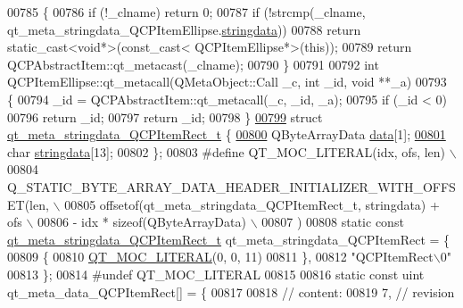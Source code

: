 \begin{DoxyCode}
00785 \{
00786     \textcolor{keywordflow}{if} (!\_clname) \textcolor{keywordflow}{return} 0;
00787     \textcolor{keywordflow}{if} (!strcmp(\_clname, qt\_meta\_stringdata\_QCPItemEllipse.\hyperlink{a00016_a35ee014e43cf9f75fa027534df3b222d}{stringdata}))
00788         \textcolor{keywordflow}{return} \textcolor{keyword}{static\_cast<}\textcolor{keywordtype}{void}*\textcolor{keyword}{>}(\textcolor{keyword}{const\_cast<} QCPItemEllipse*\textcolor{keyword}{>}(\textcolor{keyword}{this}));
00789     \textcolor{keywordflow}{return} QCPAbstractItem::qt\_metacast(\_clname);
00790 \}
00791 
00792 \textcolor{keywordtype}{int} QCPItemEllipse::qt\_metacall(QMetaObject::Call \_c, \textcolor{keywordtype}{int} \_id, \textcolor{keywordtype}{void} **\_a)
00793 \{
00794     \_id = QCPAbstractItem::qt\_metacall(\_c, \_id, \_a);
00795     \textcolor{keywordflow}{if} (\_id < 0)
00796         \textcolor{keywordflow}{return} \_id;
00797     \textcolor{keywordflow}{return} \_id;
00798 \}
\hypertarget{a00016_source_l00799}{}\hyperlink{a00016}{00799} \textcolor{keyword}{struct }\hyperlink{a00016_d4/d81/a00110}{qt\_meta\_stringdata\_QCPItemRect\_t} \{
\hypertarget{a00016_source_l00800}{}\hyperlink{a00016_abb87c72758ddd18aa3c36a7ee960fa1f}{00800}     QByteArrayData \hyperlink{a00016_abb87c72758ddd18aa3c36a7ee960fa1f}{data}[1];
\hypertarget{a00016_source_l00801}{}\hyperlink{a00016_a8006d9df79f24f9dc9846ce4485c145a}{00801}     \textcolor{keywordtype}{char} \hyperlink{a00016_a8006d9df79f24f9dc9846ce4485c145a}{stringdata}[13];
00802 \};
00803 \textcolor{preprocessor}{#define QT\_MOC\_LITERAL(idx, ofs, len) \(\backslash\)}
00804 \textcolor{preprocessor}{    Q\_STATIC\_BYTE\_ARRAY\_DATA\_HEADER\_INITIALIZER\_WITH\_OFFSET(len, \(\backslash\)}
00805 \textcolor{preprocessor}{    offsetof(qt\_meta\_stringdata\_QCPItemRect\_t, stringdata) + ofs \(\backslash\)}
00806 \textcolor{preprocessor}{        - idx * sizeof(QByteArrayData) \(\backslash\)}
00807 \textcolor{preprocessor}{    )}
00808 \textcolor{keyword}{static} \textcolor{keyword}{const} \hyperlink{a00016_d4/d81/a00110}{qt\_meta\_stringdata\_QCPItemRect\_t} 
      qt\_meta\_stringdata\_QCPItemRect = \{
00809     \{
00810 \hyperlink{a00016_a75bb9482d242cde0a06c9dbdc6b83abe}{QT\_MOC\_LITERAL}(0, 0, 11)
00811     \},
00812     \textcolor{stringliteral}{"QCPItemRect\(\backslash\)0"}
00813 \};
00814 \textcolor{preprocessor}{#undef QT\_MOC\_LITERAL}
00815 
00816 \textcolor{keyword}{static} \textcolor{keyword}{const} uint qt\_meta\_data\_QCPItemRect[] = \{
00817 
00818  \textcolor{comment}{// content:}
00819        7,       \textcolor{comment}{// revision}

\end{DoxyCode}
